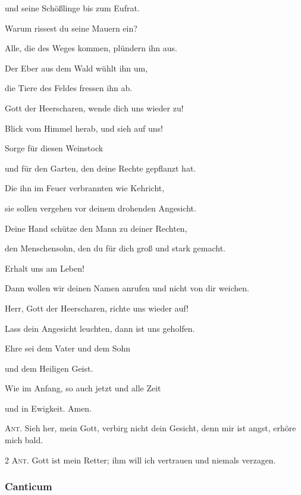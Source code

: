 und seine Schößlinge bis zum Eufrat.

\noindent Warum rissest du seine Mauern ein?~\GreStar{}~\nopagebreak

Alle, die des Weges kommen, plündern ihn aus.

\noindent Der Eber aus dem Wald wühlt ihn um,~\GreStar{}~\nopagebreak

die Tiere des Feldes fressen ihn ab.

\noindent Gott der Heerscharen, wende dich uns wieder zu!~\GreStar{}~\nopagebreak

Blick vom Himmel herab, und sieh auf uns!

\noindent Sorge für diesen Weinstock~\GreStar{}~\nopagebreak

und für den Garten, den deine Rechte gepflanzt hat.

\noindent Die ihn im Feuer verbrannten wie Kehricht,~\GreStar{}~\nopagebreak

sie sollen vergehen vor deinem drohenden Angesicht.

\noindent Deine Hand schütze den Mann zu deiner Rechten,~\GreStar{}~\nopagebreak

den Menschensohn, den du für dich groß und stark gemacht.

\noindent Erhalt uns am Leben!~\GreStar{}~\nopagebreak

Dann wollen wir deinen Namen anrufen und nicht von dir weichen. 

\noindent Herr, Gott der Heerscharen, richte uns wieder auf!~\GreStar{}~\nopagebreak

Lass dein Angesicht leuchten, dann ist uns geholfen.

\noindent Ehre sei dem Vater und dem Sohn~\GreStar{}~\nopagebreak

und dem Heiligen Geist.

\noindent Wie im Anfang, so auch jetzt und alle Zeit~\GreStar{}~\nopagebreak

und in Ewigkeit. Amen.

\vspace{10pt}

\noindent \textsc{Ant.} Sieh her, mein Gott, verbirg nicht dein Gesicht, denn mir ist angst, erhöre mich bald. 

\vspace{10pt}

\noindent \textsc{2 Ant.} Gott ist mein Retter; ihm will ich vertrauen und niemals verzagen. \nopagebreak

\subsubsection{Canticum}

